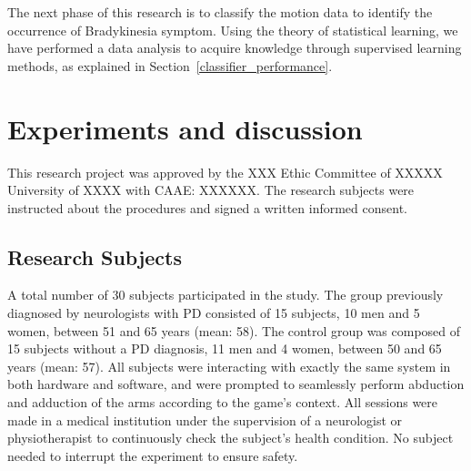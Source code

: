 \documentclass[10pt, conference, compsocconf]{IEEEtran}
\begin{document}
The next phase of this research is to classify the motion data to identify the occurrence of Bradykinesia symptom. Using the theory of statistical learning, we have performed a data analysis to acquire knowledge through supervised learning methods, as explained in Section~\ref{classifier_performance}.

\section{Experiments and discussion}
\label{sec:experimentalresults}

This research project was approved by the XXX Ethic Committee of XXXXX University of XXXX with CAAE: XXXXXX. The research subjects were instructed about the procedures and signed a written informed consent. %

\subsection{Research Subjects}

A total number of 30 subjects participated in the study. The group previously diagnosed by neurologists with PD consisted of 15 subjects, 10 men and 5 women, between 51 and 65 years (mean: 58). The control group was composed of 15 subjects without a PD diagnosis, 11 men and 4 women, between 50 and 65 years (mean: 57). All subjects were interacting with exactly the same system in both hardware and software, and were prompted to seamlessly perform abduction and adduction of the arms according to the game's context. All sessions were made in a medical institution under the supervision of a neurologist or physiotherapist to continuously check the subject's health condition. No subject needed to interrupt the experiment to ensure safety.

\end{document}
